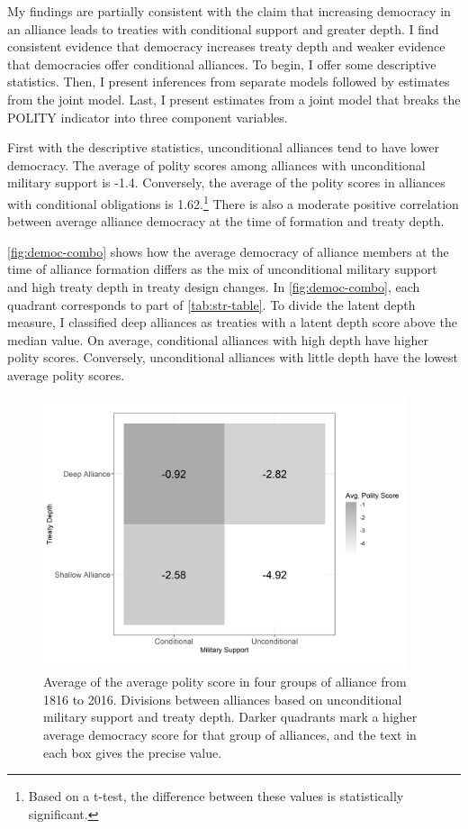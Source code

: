 \documentclass[12pt]{article}
\begin{document}
My findings are partially consistent with the claim that increasing democracy in an alliance leads to treaties with conditional support and greater depth. 
I find consistent evidence that democracy increases treaty depth and weaker evidence that democracies offer conditional alliances. 
To begin, I offer some descriptive statistics.
Then, I present inferences from separate models followed by estimates from the joint model. 
Last, I present estimates from a joint model that breaks the POLITY indicator into three component variables. 


First with the descriptive statistics, unconditional alliances tend to have lower democracy. 
The average of polity scores among alliances with unconditional military support is -1.4. 
Conversely, the average of the polity scores in alliances with conditional obligations is 1.62.\footnote{Based on a t-test, the difference between these values is statistically significant.} 
There is also a moderate positive correlation between average alliance democracy at the time of formation and treaty depth. 


\autoref{fig:democ-combo} shows how the average democracy of alliance members at the time of alliance formation differs as the mix of unconditional military support and high treaty depth in treaty design changes.
In \autoref{fig:democ-combo}, each quadrant corresponds to part of \autoref{tab:str-table}.
To divide the latent depth measure, I classified deep alliances as treaties with a latent depth score above the median value. 
On average, conditional alliances with high depth have higher polity scores. 
Conversely, unconditional alliances with little depth have the lowest average polity scores. 


\begin{figure}[hbtp]
\centering
\includegraphics[width=0.95\textwidth]{../figures/democ-combo.png}
\caption{Average of the average polity score in four groups of alliance from 1816 to 2016. Divisions between alliances based on unconditional military support and treaty depth. Darker quadrants mark a higher average democracy score for that group of alliances, and the text in each box gives the precise value. }
\label{fig:democ-combo}
\end{figure}
\end{document}
